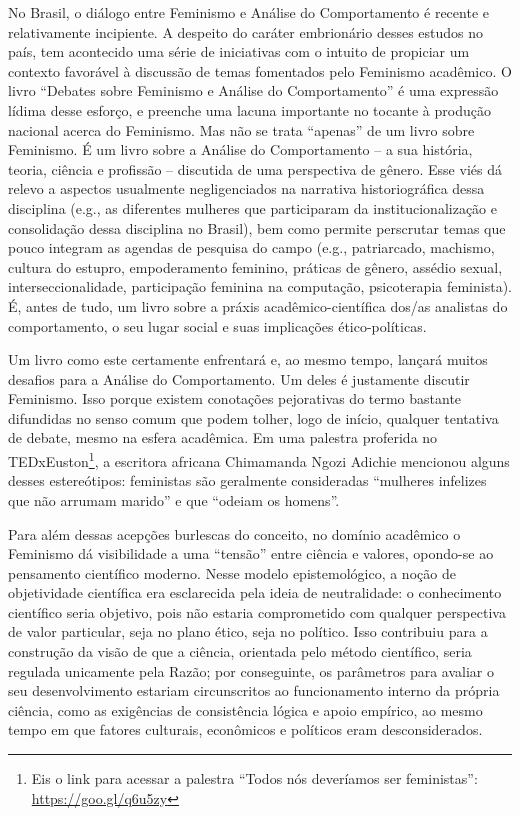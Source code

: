 No Brasil, o diálogo entre Feminismo e Análise do Comportamento é recente e relativamente incipiente. A despeito do caráter embrionário desses estudos no país, tem acontecido uma série de iniciativas com o intuito de propiciar um contexto favorável à discussão de temas fomentados pelo Feminismo acadêmico. O livro “Debates sobre Feminismo e Análise do Comportamento” é uma expressão lídima desse esforço, e preenche uma lacuna importante no tocante à produção nacional acerca do Feminismo. Mas não se trata “apenas” de um livro sobre Feminismo. É um livro sobre a Análise do Comportamento – a sua história, teoria, ciência e profissão – discutida de uma perspectiva de gênero. Esse viés dá relevo a aspectos usualmente negligenciados na narrativa historiográfica dessa disciplina (e.g., as diferentes mulheres que participaram da institucionalização e consolidação dessa disciplina no Brasil), bem como permite perscrutar temas que pouco integram as agendas de pesquisa do campo (e.g., patriarcado, machismo, cultura do estupro, empoderamento feminino, práticas de gênero, assédio sexual, interseccionalidade, participação feminina na computação, psicoterapia feminista). É, antes de tudo, um livro sobre a práxis acadêmico-científica dos/as analistas do comportamento, o seu lugar social e suas implicações ético-políticas.

Um livro como este certamente enfrentará e, ao mesmo tempo, lançará muitos desafios para a Análise do Comportamento. Um deles é justamente discutir Feminismo. Isso porque existem conotações pejorativas do termo bastante difundidas no senso comum que podem tolher, logo de início, qualquer tentativa de debate, mesmo na esfera acadêmica. Em uma palestra proferida no TEDxEuston\footnote{Eis o link para acessar a palestra “Todos nós deveríamos ser feministas”: \url{https://goo.gl/q6u5zy}}, a escritora africana Chimamanda Ngozi Adichie mencionou alguns desses estereótipos: feministas são geralmente consideradas “mulheres infelizes que não arrumam marido” e que “odeiam os homens”. 

Para além dessas acepções burlescas do conceito, no domínio acadêmico o Feminismo dá visibilidade a uma “tensão” entre ciência e valores, opondo-se ao pensamento científico moderno. Nesse modelo epistemológico, a noção de objetividade científica era esclarecida pela ideia de neutralidade: o conhecimento científico seria objetivo, pois não estaria comprometido com qualquer perspectiva de valor particular, seja no plano ético, seja no político. Isso contribuiu para a construção da visão de que a ciência, orientada pelo método científico, seria regulada unicamente pela Razão; por conseguinte, os parâmetros para avaliar o seu desenvolvimento estariam circunscritos ao funcionamento interno da própria ciência, como as exigências de consistência lógica e apoio empírico, ao mesmo tempo em que fatores culturais, econômicos e políticos eram desconsiderados. 

